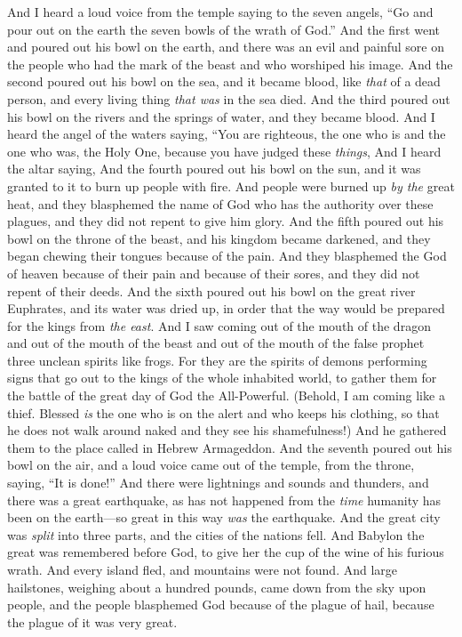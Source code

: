 \begin{biblechapter} %
 And I heard a loud voice from the temple saying to the seven angels, “Go and pour out on the earth the seven bowls of the wrath of God.”
\verse And the first went and poured out his bowl on the earth, and there was an evil and painful sore on the people who had the mark of the beast and who worshiped his image.
\verse And the second poured out his bowl on the sea, and it became blood, like \textit{that} of a dead person, and every living thing \textit{that was} in the sea died.
\verse And the third poured out his bowl on the rivers and the springs of water, and they became blood.
\verse And I heard the angel of the waters saying,
\verse “You are righteous, the one who is and the one who was, the Holy One, 
because you have judged these \textit{things},
\verse And I heard the altar saying,
\verse And the fourth poured out his bowl on the sun, and it was granted to it to burn up people with fire.
\verse And people were burned up \textit{by the} great heat, and they blasphemed the name of God who has the authority over these plagues, and they did not repent to give him glory.
\verse And the fifth poured out his bowl on the throne of the beast, and his kingdom became darkened, and they began chewing their tongues because of the pain.
\verse And they blasphemed the God of heaven because of their pain and because of their sores, and they did not repent of their deeds.
\verse And the sixth poured out his bowl on the great river Euphrates, and its water was dried up, in order that the way would be prepared for the kings from \textit{the east}.
\verse And I saw coming out of the mouth of the dragon and out of the mouth of the beast and out of the mouth of the false prophet three unclean spirits like frogs.
\verse For they are the spirits of demons performing signs that go out to the kings of the whole inhabited world, to gather them for the battle of the great day of God the All-Powerful.
\verse (Behold, I am coming like a thief. Blessed \textit{is} the one who is on the alert and who keeps his clothing, so that he does not walk around naked and they see his shamefulness!)
\verse And he gathered them to the place called in Hebrew Armageddon.
\verse And the seventh poured out his bowl on the air, and a loud voice came out of the temple, from the throne, saying, “It is done!”
\verse And there were lightnings and sounds and thunders, and there was a great earthquake, as has not happened from the \textit{time} humanity has been on the earth—so great in this way \textit{was} the earthquake.
\verse And the great city was \textit{split} into three parts, and the cities of the nations fell. And Babylon the great was remembered before God, to give her the cup of the wine of his furious wrath.
\verse And every island fled, and mountains were not found.
\verse And large hailstones, weighing about a hundred pounds, came down from the sky upon people, and the people blasphemed God because of the plague of hail, because the plague of it was very great.
\end{biblechapter}

